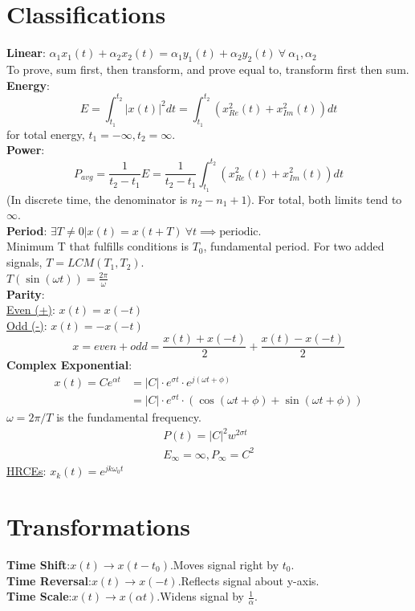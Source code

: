 \documentclass[twocolumn]{article}
\begin{document}
\section*{Classifications}
\pagestyle{empty}
\textbf{Linear}: $\alpha_1 x_1(t)+\alpha_2 x_2(t) = \alpha_1 y_1(t)+\alpha_2 y_2(t) ~\forall~ \alpha_1,\alpha_2$\\
To prove, sum first, then transform, and prove equal to, transform first then sum.\\
\textbf{Energy}: 
\begin{equation*}
    E = \int_{t_1}^{t_2} |x(t)|^2 dt = \int_{t_1}^{t_2}(x^2_{Re}(t)+x^2_{Im}(t))dt
\end{equation*}
for total energy, $t_1=-\infty, t_2 = \infty$.\\
\textbf{Power}:
\begin{equation*}
    P_{avg} = \frac{1}{t_2-t_1}E = \frac{1}{t_2-t_1}\int_{t_1}^{t_2}(x^2_{Re}(t)+x^2_{Im}(t))dt
\end{equation*}
(In discrete time, the denominator is $n_2-n_1+1$). For total, both limits tend to $\infty$.\\
\textbf{Period}: $\exists T \neq 0 | x(t) = x(t+T) ~\forall t \implies \text{periodic}$.\\
Minimum T that fulfills conditions is $T_0$, fundamental period.
For two added signals, $T = LCM(T_1,T_2)$.\\
$T(\sin(\omega t)) = \frac{2\pi}{\omega}$\\
\textbf{Parity}:\\
\underline{Even (+)}: $x(t)=x(-t)$\\
\underline{Odd (-)}: $x(t) = -x(-t)$\\
\begin{equation*}
    x = even+odd = \frac{x(t)+x(-t)}{2}+\frac{x(t)-x(-t)}{2}
\end{equation*}
\textbf{Complex Exponential}:
\begin{align*}
    x(t) = Ce^{\alpha t} &= |C|\cdot e^{\sigma t}\cdot e^{j(\omega t +\phi)} \\
    &= |C|\cdot e^{\sigma t}\cdot (\cos(\omega t +\phi)+\sin(\omega t +\phi))
\end{align*}
$\omega = 2\pi/T$ is the fundamental frequency.
\begin{align*}
    P(t) = |C|^2w^{2\sigma t}\\
    E_\infty = \infty , P_\infty = C^2
\end{align*}
\underline{HRCEs}: $x_k(t) = e^{jk\omega_0 t}$
\section*{Transformations}
\textbf{Time Shift}:$x(t)\rightarrow x(t-t_0)$.Moves signal right by $t_0$.\\
\textbf{Time Reversal}:$x(t)\rightarrow x(-t)$.Reflects signal about y-axis.\\
\textbf{Time Scale}:$x(t)\rightarrow x(\alpha t)$.Widens signal by $\frac{1}{\alpha}$.
\end{document}
